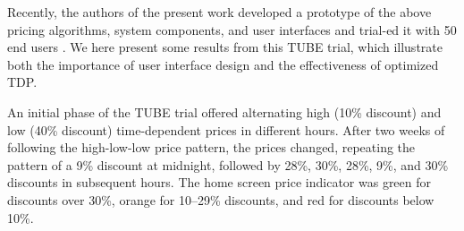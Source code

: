 Recently, the authors of the present work developed a prototype of the above pricing algorithms, system components, and user interfaces and trial-ed it with 50 end users \cite{ha2012tube}. We here present some results from this TUBE trial, which illustrate both the importance of user interface design and the effectiveness of optimized TDP. %

An initial phase of the TUBE trial offered alternating high (10\% discount) and low (40\% discount) time-dependent prices in different hours. After two weeks of following the high-low-low price pattern, the prices changed, repeating the pattern of a 9\% discount at midnight, followed by 28\%, 30\%, 28\%, 9\%, and 30\% discounts in subsequent hours. The home screen price indicator was green for discounts over 30\%, orange for 10--29\% discounts, and red for discounts below 10\%. %

